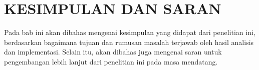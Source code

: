 \chapter{KESIMPULAN DAN SARAN}
\label{chap:KesimpulanSaran}


Pada bab ini akan dibahas mengenai kesimpulan yang didapat dari penelitian ini, berdasarkan bagaimana tujuan dan rumusan masalah terjawab oleh hasil analisis dan implementasi. Selain itu, akan dibahas juga mengenai saran untuk pengembangan lebih lanjut dari penelitian ini pada masa mendatang.





\newpage

